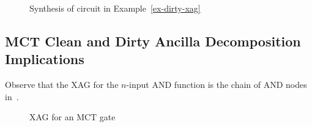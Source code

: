 \begin{figure}[t]
  \centering
  \scalebox{0.8} {
    
  }
  \caption{Synthesis of circuit in Example~\ref{ex-dirty-xag}}
  \label{fig-prop-decomp}
\end{figure}
  


    
    

\subsection{MCT Clean and Dirty Ancilla Decomposition Implications}

Observe that the XAG for the $n$-input AND function is the chain of AND nodes in~.

\begin{figure}[t]
  \centering
  \scalebox{1.0} {
    


  }
  \caption{XAG for an MCT gate}
  \label{fig-mct-xag}
\end{figure}

